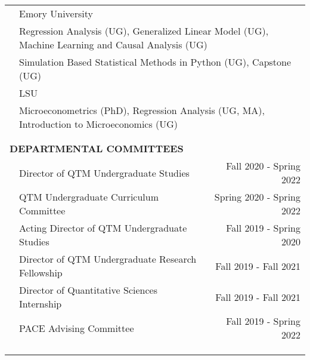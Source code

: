 \documentclass[10pt]{article}
\begin{document}
\begin{center}
\begin{tabular}{llllr}
& \multicolumn{4}{l}{Emory University}\vspace{0.1cm}\\
& \multicolumn{4}{l}{\quad Regression Analysis (UG), Generalized Linear Model (UG), Machine Learning and Causal Analysis (UG)}\vspace{0.1cm}\\
& \multicolumn{4}{l}{\quad Simulation Based Statistical Methods in Python (UG), Capstone (UG)}\vspace{0.1cm}\\
& \multicolumn{4}{l}{LSU}\vspace{0.1cm}\\
& \multicolumn{4}{l}{\quad Microeconometrics (PhD), Regression Analysis (UG, MA), Introduction to Microeconomics (UG)}\vspace{0.1cm}\\
\multicolumn{5}{l}{} \\\\
\multicolumn{5}{l}{{\Large \textbf{D}}\textbf{EPARTMENTAL COMMITTEES}} \vspace{0.1cm}\\
& \multicolumn{3}{l}{Director of QTM Undergraduate Studies}&\multicolumn{1}{r}{Fall 2020 - Spring 2022}\\
& \multicolumn{3}{l}{QTM Undergraduate Curriculum Committee}&\multicolumn{1}{r}{Spring 2020 - Spring 2022}\\
& \multicolumn{3}{l}{Acting Director of QTM Undergraduate Studies}&\multicolumn{1}{r}{Fall 2019 - Spring 2020}\\
& \multicolumn{3}{l}{Director of QTM Undergraduate Research Fellowship}&\multicolumn{1}{r}{Fall 2019 - Fall 2021}\\
& \multicolumn{3}{l}{Director of Quantitative Sciences Internship}&\multicolumn{1}{r}{Fall 2019 - Fall 2021}\\
& \multicolumn{3}{l}{PACE Advising Committee}&\multicolumn{1}{r}{Fall 2019 - Spring 2022}\\
\vspace{0.1cm}\\
\multicolumn{5}{l}{}\\\\

\end{tabular}
\end{center}
\end{document}
